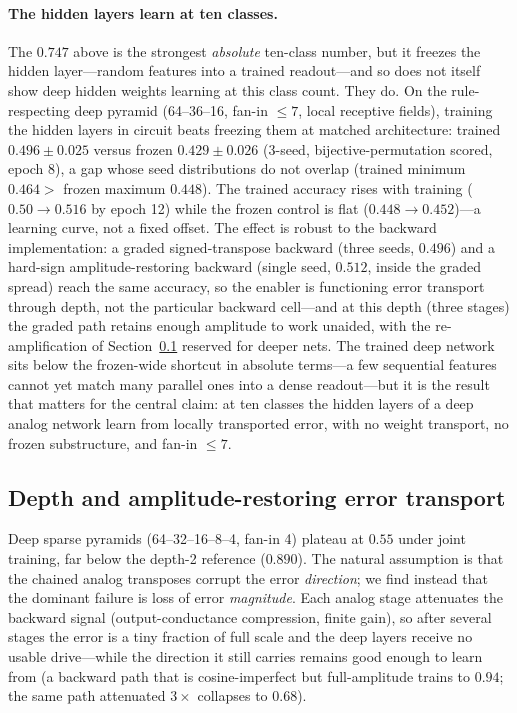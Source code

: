 \documentclass[11pt]{article}
\begin{document}
\paragraph{The hidden layers learn at ten classes.} The $0.747$ above is the strongest \emph{absolute} ten-class number, but it freezes the hidden layer---random features into a trained readout---and so does not itself show deep hidden weights learning at this class count. They do. On the rule-respecting deep pyramid (64--36--16, fan-in $\le 7$, local receptive fields), training the hidden layers in circuit beats freezing them at matched architecture: trained $0.496\pm0.025$ versus frozen $0.429\pm0.026$ (3-seed, bijective-permutation scored, epoch 8), a gap whose seed distributions do not overlap (trained minimum $0.464 >$ frozen maximum $0.448$). The trained accuracy rises with training ($0.50\!\to\!0.516$ by epoch 12) while the frozen control is flat ($0.448\!\to\!0.452$)---a learning curve, not a fixed offset. The effect is robust to the backward implementation: a graded signed-transpose backward (three seeds, $0.496$) and a hard-sign amplitude-restoring backward (single seed, $0.512$, inside the graded spread) reach the same accuracy, so the enabler is functioning error transport through depth, not the particular backward cell---and at this depth (three stages) the graded path retains enough amplitude to work unaided, with the re-amplification of Section~\ref{sec:bksign} reserved for deeper nets. The trained deep network sits below the frozen-wide shortcut in absolute terms---a few sequential features cannot yet match many parallel ones into a dense readout---but it is the result that matters for the central claim: at ten classes the hidden layers of a deep analog network learn from locally transported error, with no weight transport, no frozen substructure, and fan-in $\le 7$.

\subsection{Depth and amplitude-restoring error transport}
\label{sec:bksign}

Deep sparse pyramids (64--32--16--8--4, fan-in 4) plateau at $0.55$ under joint training, far below the depth-2 reference ($0.890$). The natural assumption is that the chained analog transposes corrupt the error \emph{direction}; we find instead that the dominant failure is loss of error \emph{magnitude}. Each analog stage attenuates the backward signal (output-conductance compression, finite gain), so after several stages the error is a tiny fraction of full scale and the deep layers receive no usable drive---while the direction it still carries remains good enough to learn from (a backward path that is cosine-imperfect but full-amplitude trains to $0.94$; the same path attenuated $3\times$ collapses to $0.68$).
\end{document}
